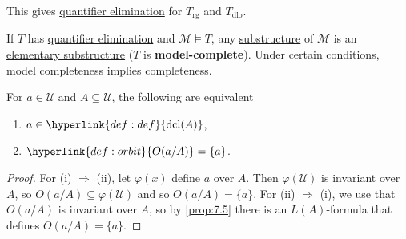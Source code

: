 \documentclass{article}
\let\models\vDash
\DeclareMathOperator{\dcl}{dcl}
\DeclareMathOperator{\acl}{acl}
\newcommand{\named}[1]{\textbf{#1}\index{#1}}
\begin{document}
This gives \hyperlink{def:qe}{quantifier elimination} for $T_{\text{rg}}$ and $T_{\text{dlo}}$.
\begin{remark}
  If $T$ has \hyperlink{def:qe}{quantifier elimination} and $\mathcal{M} \models T$, any \hyperlink{def:subs}{substructure} of $\mathcal{M}$ is an \hyperlink{def:elsubs}{elementary substructure} ($T$ is \named{model-complete}). Under certain conditions, model completeness implies completeness.
\end{remark}
\begin{nprop}\label{prop:7.11}
  For $a \in \mathcal{U}$ and $A \subseteq \mathcal{U}$, the following are equivalent
  \begin{enumerate}[label=(\roman*)]
    \item $a \in \hyperlink{def:def}{\dcl(A)}$,
    \item $\hyperlink{def:orbit}{O(a/A)} = \{a\}$. %
  \end{enumerate}
\end{nprop}
\begin{proof}
  For (i) $\Rightarrow$ (ii), let $\varphi(x)$ define $a$ over $A$. Then $\varphi(\mathcal{U})$ is invariant over $A$, so $O(a/A) \subseteq \varphi(\mathcal{U})$ and so $O(a/A) = \{a\}$. For (ii) $\Rightarrow$ (i), we use that $O(a/A)$ is invariant over $A$, so by \cref{prop:7.5} there is an $L(A)$-formula that defines $O(a/A) =\{a\}$.
\end{proof}
\end{document}
